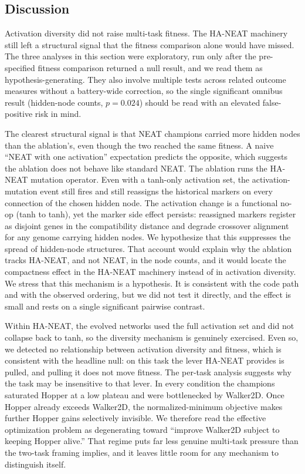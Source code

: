 \documentclass[12pt]{article}
\begin{document}
\subsection{Discussion}
\label{sec:main-discussion}

Activation diversity did not raise multi-task fitness.
The HA-NEAT machinery still left a structural signal that the fitness comparison alone would have missed.
The three analyses in this section were exploratory, run only after the pre-specified fitness comparison returned a null result, and we read them as hypothesis-generating.
They also involve multiple tests across related outcome measures without a battery-wide correction, so the single significant omnibus result (hidden-node counts, $p = 0.024$) should be read with an elevated false-positive risk in mind.

The clearest structural signal is that NEAT champions carried more hidden nodes than the ablation's, even though the two reached the same fitness.
A naive ``NEAT with one activation'' expectation predicts the opposite, which suggests the ablation does not behave like standard NEAT.
The ablation runs the HA-NEAT mutation operator.
Even with a tanh-only activation set, the activation-mutation event still fires and still reassigns the historical markers on every connection of the chosen hidden node.
The activation change is a functional no-op (tanh to tanh), yet the marker side effect persists: reassigned markers register as disjoint genes in the compatibility distance and degrade crossover alignment for any genome carrying hidden nodes.
We hypothesize that this suppresses the spread of hidden-node structures.
That account would explain why the ablation tracks HA-NEAT, and not NEAT, in the node counts, and it would locate the compactness effect in the HA-NEAT machinery instead of in activation diversity.
We stress that this mechanism is a hypothesis.
It is consistent with the code path and with the observed ordering, but we did not test it directly, and the effect is small and rests on a single significant pairwise contrast.

Within HA-NEAT, the evolved networks used the full activation set and did not collapse back to tanh, so the diversity mechanism is genuinely exercised.
Even so, we detected no relationship between activation diversity and fitness, which is consistent with the headline null: on this task the lever HA-NEAT provides is pulled, and pulling it does not move fitness.
The per-task analysis suggests why the task may be insensitive to that lever.
In every condition the champions saturated Hopper at a low plateau and were bottlenecked by Walker2D.
Once Hopper already exceeds Walker2D, the normalized-minimum objective makes further Hopper gains selectively invisible.
We therefore read the effective optimization problem as degenerating toward ``improve Walker2D subject to keeping Hopper alive.''
That regime puts far less genuine multi-task pressure than the two-task framing implies, and it leaves little room for any mechanism to distinguish itself.
\end{document}
